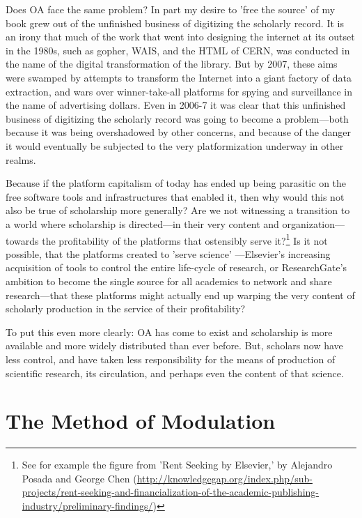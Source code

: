 \documentclass[11pt]{report}
\begin{document}
Does OA face the same problem?  In part my desire to 'free the source' of my book grew out of the unfinished business of digitizing the scholarly record.  It is an irony that much of the work that went into designing the internet at its outset in the 1980s, such as gopher, WAIS, and the HTML of CERN, was conducted in the name of the digital transformation of the library.  But by 2007, these aims were swamped by attempts to transform the Internet into a giant factory of data extraction, and wars over winner-take-all platforms for spying and surveillance in the name of advertising dollars.  Even in 2006-7 it was clear that this unfinished business of digitizing the scholarly record was going to become a problem---both because it was being overshadowed by other concerns, and because of the danger it would eventually be subjected to the very platformization underway in other realms. 

Because if the platform capitalism of today has ended up being parasitic on the free software tools and infrastructures that enabled it, then why would this not also be true of scholarship more generally?  Are we not witnessing a transition to a world where scholarship is directed---in their very content and organization---towards the profitability of the platforms that ostensibly serve it?\footnote{See for example the figure from 'Rent Seeking by Elsevier,' by Alejandro Posada and George Chen  (\url{http://knowledgegap.org/index.php/sub-projects/rent-seeking-and-financialization-of-the-academic-publishing-industry/preliminary-findings/})}  Is it not possible, that the platforms created to 'serve science' ---Elsevier's increasing acquisition of tools to control the entire life-cycle of research, or ResearchGate's ambition to become the single source for all academics to network and share research---that these platforms might actually end up warping the very content of scholarly production in the service of their profitability? 

To put this even more clearly: OA has come to exist and scholarship is more available and more widely distributed than ever before.  But, scholars now have less control, and have taken less responsibility for the means of production of scientific research, its circulation, and perhaps even the content of that science.  

\chapter*{The Method of Modulation}
\label{sec:org276bfcc}
\end{document}
